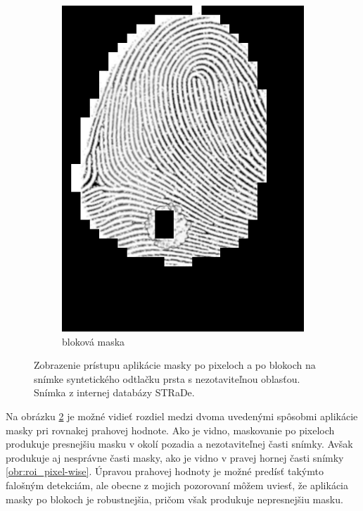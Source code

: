 \begin{figure}[h]
\begin{subfigure}[b]{0.3\linewidth}
      \includegraphics[width=\linewidth]{obrazky-figures/roi_block-wise.png}
      \caption{bloková maska}
      \label{obr:roi_block-wise}
    \end{subfigure}
    \caption{Zobrazenie prístupu aplikácie masky po pixeloch a po blokoch na snímke syntetického odtlačku prsta s nezotaviteľnou oblasťou.
            Snímka z internej databázy STRaDe.}
    \label{obr:typy_roi_masiek}
  \end{figure}

  Na obrázku \ref{obr:typy_roi_masiek} je možné vidieť rozdiel medzi dvoma uvedenými spôsobmi aplikácie masky pri rovnakej prahovej hodnote.
  Ako je vidno, maskovanie po pixeloch produkuje presnejšiu masku v okolí pozadia a nezotaviteľnej časti snímky. Avšak produkuje aj nesprávne časti masky,
  ako je vidno v pravej hornej časti snímky \ref{obr:roi_pixel-wise}. Úpravou prahovej hodnoty je možné predísť takýmto falošným detekciám, ale obecne z mojich
  pozorovaní môžem uviesť, že aplikácia masky po blokoch je robustnejšia, pričom však produkuje nepresnejšiu masku.
  

